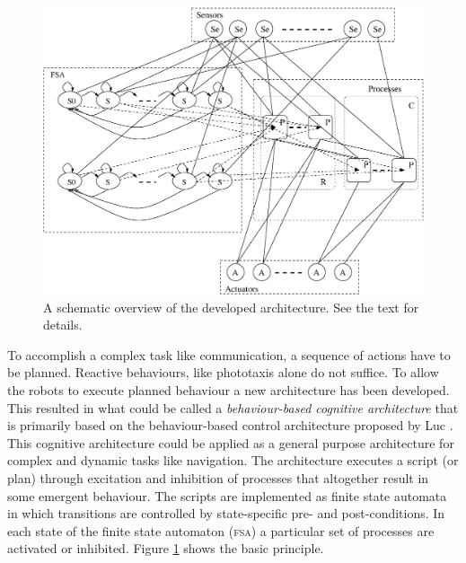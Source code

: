 
\begin{figure}[t]
\centerline{\includegraphics[width=12cm]{lang_games//fsa.eps}}
\caption{A schematic overview of the developed architecture. See the text for details.}
\label{f:architscheme}
\end{figure}

To accomplish a complex task like communication, a sequence of actions have to be planned. Reactive behaviours, like phototaxis alone do not suffice. To allow the robots to execute planned behaviour a new architecture has been developed. This resulted in what could be called a {\em behaviour-based cognitive architecture} that is primarily based on the behaviour-based control architecture proposed by Luc \citet{steels:1994b}. This cognitive architecture could be applied as a general purpose architecture for complex and dynamic tasks like navigation. The architecture executes a script (or plan) through excitation and inhibition of processes that altogether result in some emergent behaviour. The scripts are implemented as finite state automata in which transitions are controlled by state-specific pre- and post-conditions. In each state of the finite state automaton (\textsc{fsa}) a particular set of processes are activated or inhibited. Figure \ref{f:architscheme} shows the basic principle.

